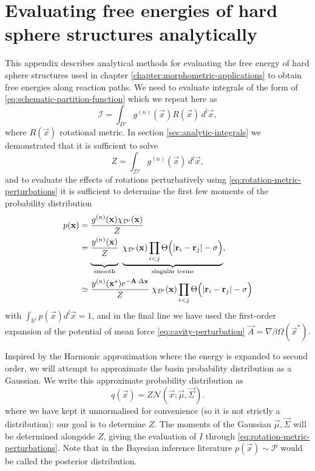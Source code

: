 \documentclass[11pt,twoside]{report}
\begin{document}
\chapter{Evaluating free energies of hard sphere structures analytically}
\label{appendix:bayesian}

This appendix describes analytical methods for evaluating the free energy of hard sphere structures used in chapter \ref{chapter:morphometric-applications} to obtain free energies along reaction paths.
We need to evaluate integrals of the form of \eqref{eq:schematic-partition-function} which we repeat here as
\begin{equation*}
  \mathcal{I}
  =
  \int_{D'}
  g^{(n)}(\vec{x}) R(\vec{x})
  \, d^l \vec{x},
\end{equation*}
where $R(\vec{x})$ rotational metric.
In section \eqref{sec:analytic-integrals} we demonstrated that it is sufficient to solve
\begin{equation*}
  Z = \int_{\mathcal{D}'} g^{(n)}(\vec{x}) \, d^l \vec{x},
\end{equation*}
and to evaluate the effects of rotations perturbatively using \eqref{eq:rotation-metric-perturbations} it is sufficient to determine the first few moments of the probability distribution
\begin{equation*}
  \begin{split}
  p(\vec{x})
  &=
  \frac{g^{(n)}(\vec{x}) \chi_{\mathcal{D}'}(\vec{x})}{Z}
  \\ &=
  \underbrace{
    \frac{y^{(n)}(\vec{x})}{Z}
    \vphantom{\prod_{i < j}}
  }_\textrm{smooth}
  \;
  \underbrace{
    \chi_{\mathcal{D}'}(\vec{x})
    \prod_{i < j}
    \Theta \Big( |\vec{r}_i - \vec{r}_j| - \sigma \Big)
  }_\textrm{singular terms},
  \\ &\simeq
  \frac{y^{(n)}(\vec{x}^*) e^{-\vec{A} \cdot \Delta \vec{x}}}{Z}
  \;
  \chi_{\mathcal{D}'}(\vec{x})
  \prod_{i < j}
  \Theta \Big( |\vec{r}_i - \vec{r}_j| - \sigma \Big)
  \end{split}
\end{equation*}
with $\int_{\mathbb{R}^l} p(\vec{x}) d^l\vec{x} = 1$, and in the final line we have used the first-order expansion of the potential of mean force \eqref{eq:cavity-perturbation} $\vec{A} = \nabla \beta\Omega(\vec{x}^*)$.

Inspired by the Harmonic approximation where the energy is expanded to second order, we will attempt to approximate the basin probability distribution as a Gaussian.
We write this approximate probability distribution as
\begin{equation}
  q(\vec{x}) = Z \mathcal{N}(\vec{x}; \vec{\mu}, \vec{\Sigma}).
\end{equation}
where we have kept it unnormalised for convenience (so it is not strictly a distribution): our goal is to determine $Z$.
The moments of the Gaussian $\vec{\mu}, \vec{\Sigma}$ will be determined alongside $Z$, giving the evaluation of $I$ through \eqref{eq:rotation-metric-perturbations}.
Note that in the Bayesian inference literature $p(\vec{x}) \sim \mathcal{P}$ would be called the posterior distribution.
\end{document}
